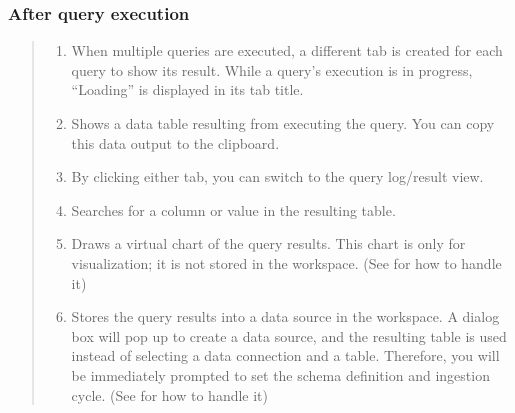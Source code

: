 \documentclass[letterpaper,10pt,english]{sphinxmanual}
\begin{document}
\subsubsection{After query execution}
\label{\detokenize{discovery/part06/06_03-use_a_workbench:id7}}\begin{quote}

\begin{figure}[H]
\centering

\noindent{}
\end{figure}
\begin{enumerate}
\def\theenumi{\arabic{enumi}}
\def\labelenumi{\theenumi .}
\makeatletter\def\p@enumii{\p@enumi \theenumi .}\makeatother
\item {} 
 When multiple queries are executed, a different tab is created for each query to show its result. While a query’s execution is in progress, “Loading” is displayed in its tab title.

\item {} 
 Shows a data table resulting from executing the query. You can copy this data output to the clipboard.

\item {} 
 By clicking either tab, you can switch to the query log/result view.

\item {} 
 Searches for a column or value in the resulting table.

\item {} 
 Draws a virtual chart of the query results. This chart is only for visualization; it is not stored in the workspace. (See {\hyperref[\detokenize{discovery/part04/manage_charts::doc}]{}} for how to handle it)

\item {} 
 Stores the query results into a data source in the workspace. A dialog box will pop up to create a data source, and the resulting table is used instead of selecting a data connection and a table. Therefore, you will be immediately prompted to set the schema definition and ingestion cycle. (See {\hyperref[\detokenize{discovery/part02/create_a_data_source::doc}]{}} for how to handle it)


\end{enumerate}
\end{quote}
\end{document}
